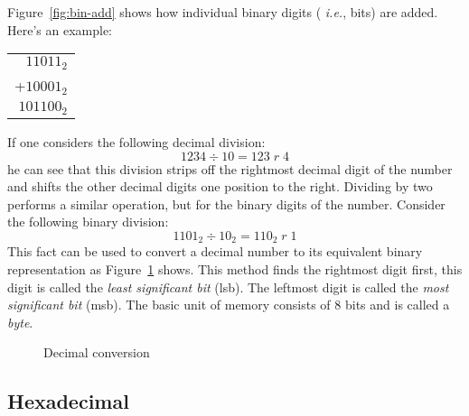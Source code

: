Figure~\ref{fig:bin-add} shows how individual binary digits ({\em
i.e.}, bits) are added. Here's an example:

\begin{tabular}{r}
 $11011_2$ \\
+$10001_2$ \\
\hline
$101100_2$ \\
\end{tabular}

If one considers the following decimal division:
\[ 1234 \div 10 = 123\; r\; 4 \]
he can see that this division strips off the rightmost decimal digit of 
the number and shifts the other decimal digits one position to the right.
Dividing by two performs a similar operation, but for the binary digits
of the number. Consider the following binary division:
\[ 1101_2 \div 10_2 = 110_2\; r\; 1 \]
This fact can be used to convert a decimal
number to its equivalent binary representation as
Figure~\ref{fig:dec-convert} shows. This method finds the rightmost
digit first, this digit is called the \emph{least significant bit} (lsb). 
The leftmost digit is called the \emph{most significant bit} (msb). 
The basic unit of memory consists of 8 bits and is called a \emph{byte}.

\begin{figure}[t]
\centering
{}
\caption{Decimal conversion \label{fig:dec-convert}}
\end{figure}

\subsection{Hexadecimal}

